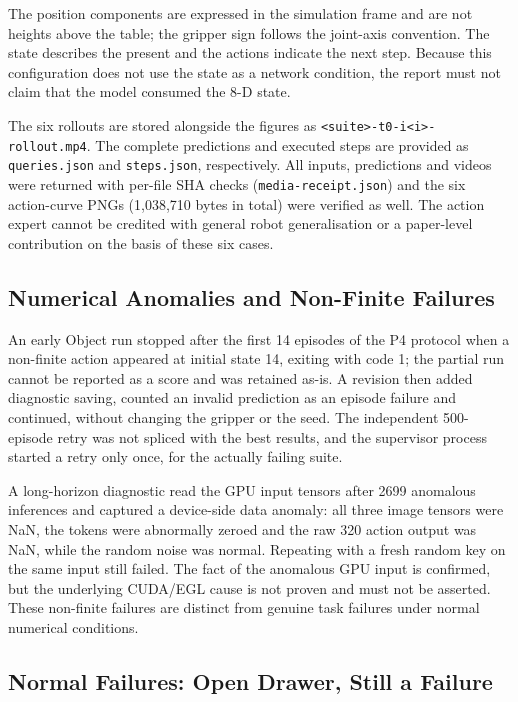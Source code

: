 The position components are expressed in the simulation frame and are not
heights above the table; the gripper sign follows the joint-axis convention.
The state describes the present and the actions indicate the next step. Because
this configuration does not use the state as a network condition, the report
must not claim that the model consumed the 8-D state.

The six rollouts are stored alongside the figures as
\texttt{<suite>-t0-i<i>-rollout.mp4}. The complete predictions and executed
steps are provided as \texttt{queries.json} and \texttt{steps.json},
respectively. All inputs, predictions and videos were returned with per-file
SHA checks (\texttt{media-receipt.json}) and the six action-curve PNGs
(1{,}038{,}710 bytes in total) were verified as well. The action expert cannot be
credited with general robot generalisation or a paper-level contribution on the
basis of these six cases.

\subsection{Numerical Anomalies and Non-Finite Failures}
\label{sec:pi05-nan}

An early Object run stopped after the first 14 episodes of the P4 protocol when
a non-finite action appeared at initial state 14, exiting with code 1; the
partial run cannot be reported as a score and was retained as-is. A revision
then added diagnostic saving, counted an invalid prediction as an episode
failure and continued, without changing the gripper or the seed. The independent
500-episode retry was not spliced with the best results, and the supervisor
process started a retry only once, for the actually failing suite.

A long-horizon diagnostic read the GPU input tensors after 2699 anomalous
inferences and captured a device-side data anomaly: all three image tensors were
NaN, the tokens were abnormally zeroed and the raw 320 action output was NaN,
while the random noise was normal. Repeating with a fresh random key on the same
input still failed. The fact of the anomalous GPU input is confirmed, but the
underlying CUDA/EGL cause is not proven and must not be asserted. These
non-finite failures are distinct from genuine task failures under normal
numerical conditions.

\subsection{Normal Failures: Open Drawer, Still a Failure}
\label{sec:pi05-drawer}

